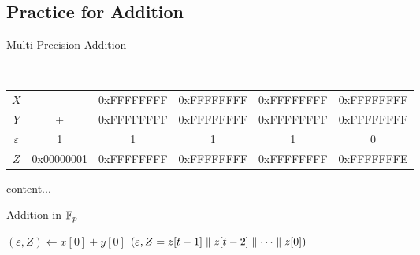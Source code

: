 \subsection{Practice for Addition}

\begin{algorithm}[H]
\DontPrintSemicolon
\caption{Multi-Precision Addition}
\BlankLine
{}
\end{algorithm}
\begin{example}
\ \begin{table}[h!]\centering\renewcommand{\arraystretch}{1.25}
	{\ttfamily\begin{tabular*}{\textwidth}{@{\extracolsep{\fill}}cccccc}
	$X$ & & 0xFFFFFFFF & 0xFFFFFFFF & 0xFFFFFFFF & 0xFFFFFFFF \\
	$Y$ & + & 0xFFFFFFFF & 0xFFFFFFFF & 0xFFFFFFFF & 0xFFFFFFFF \\
	$\varepsilon$ & 1 & 1 & 1 & 1 & 0 \\ \cline{2-6}
	$Z$ & 0x00000001 & 0xFFFFFFFF & 0xFFFFFFFF & 0xFFFFFFFF & 0xFFFFFFFE \\
	\end{tabular*}}
\end{table}
\end{example}

\begin{note}
	content...
\end{note}

\begin{algorithm}[H]
	\DontPrintSemicolon
	\caption{Addition in $\mathbb{F}_p$}
	\BlankLine
	$(\varepsilon,Z)\gets x[0]+y[0]$\;
	\Return $(\varepsilon, Z=z[t-1]\parallel z[t-2]\parallel\cdots\parallel z[0])$\;
\end{algorithm}


